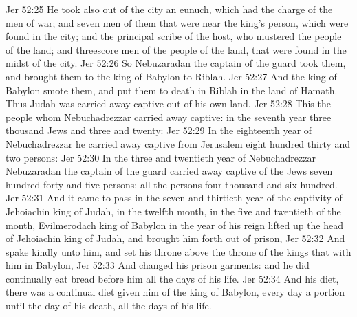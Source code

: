 \vs Jer 52:25 He took also out of the city an eunuch, which had the charge of the men of war; and seven men of them that were near the king's person, which were found in the city; and the principal scribe of the host, who mustered the people of the land; and threescore men of the people of the land, that were found in the midst of the city.
\vs Jer 52:26 So Nebuzaradan the captain of the guard took them, and brought them to the king of Babylon to Riblah.
\vs Jer 52:27 And the king of Babylon smote them, and put them to death in Riblah in the land of Hamath. Thus Judah was carried away captive out of his own land.
\vs Jer 52:28 This  the people whom Nebuchadrezzar carried away captive: in the seventh year three thousand Jews and three and twenty:
\vs Jer 52:29 In the eighteenth year of Nebuchadrezzar he carried away captive from Jerusalem eight hundred thirty and two persons:
\vs Jer 52:30 In the three and twentieth year of Nebuchadrezzar Nebuzaradan the captain of the guard carried away captive of the Jews seven hundred forty and five persons: all the persons  four thousand and six hundred.
\vs Jer 52:31 And it came to pass in the seven and thirtieth year of the captivity of Jehoiachin king of Judah, in the twelfth month, in the five and twentieth  of the month,  Evilmerodach king of Babylon in the  year of his reign lifted up the head of Jehoiachin king of Judah, and brought him forth out of prison,
\vs Jer 52:32 And spake kindly unto him, and set his throne above the throne of the kings that  with him in Babylon,
\vs Jer 52:33 And changed his prison garments: and he did continually eat bread before him all the days of his life.
\vs Jer 52:34 And  his diet, there was a continual diet given him of the king of Babylon, every day a portion until the day of his death, all the days of his life.
